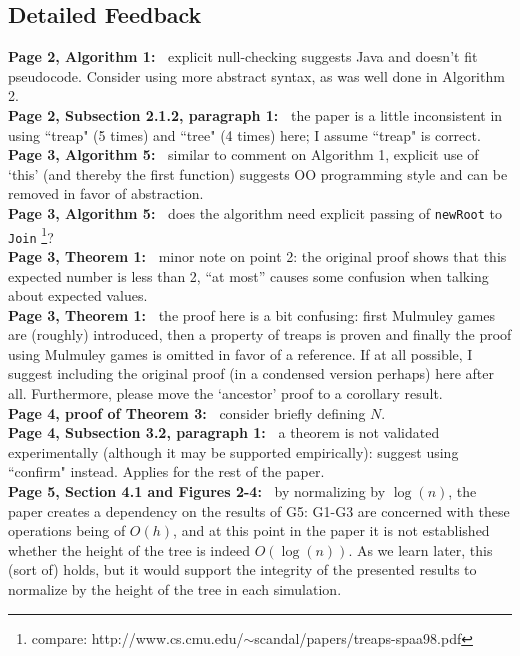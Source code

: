 \documentclass[11pt,a4paper,oneside,fleqn]{article}
\begin{document}
\subsection*{Detailed Feedback}
\textbf{Page 2, Algorithm 1:~} explicit null-checking suggests Java and doesn't fit pseudocode. Consider using more abstract syntax, as was well done in Algorithm 2. \\
\textbf{Page 2, Subsection 2.1.2, paragraph 1:~} the paper is a little inconsistent in using ``treap" (5 times) and ``tree" (4 times) here; I assume ``treap" is correct. \\
\textbf{Page 3, Algorithm 5:~} similar to comment on Algorithm 1, explicit use of `this' (and thereby the first function) suggests OO programming style and can be removed in favor of abstraction. \\
\textbf{Page 3, Algorithm 5:~} does the algorithm need explicit passing of \verb+newRoot+ to \verb+Join+ \footnote{compare: http://www.cs.cmu.edu/$\sim$scandal/papers/treaps-spaa98.pdf}? \\
\textbf{Page 3, Theorem 1:~} minor note on point 2: the original proof shows that this expected number is less than 2, ``at most'' causes some confusion when talking about expected values. \\
\textbf{Page 3, Theorem 1:~} the proof here is a bit confusing: first Mulmuley games are (roughly) introduced, then a property of treaps is proven and finally the proof using Mulmuley games is omitted in favor of a reference. If at all possible, I suggest including the original proof (in a condensed version perhaps) here after all. Furthermore, please move the `ancestor' proof to a corollary result. \\ 
\textbf{Page 4, proof of Theorem 3:~} consider briefly defining $N$. \\
\textbf{Page 4, Subsection 3.2, paragraph 1:~} a theorem is not validated experimentally (although it may be supported empirically): suggest using ``confirm" instead. Applies for the rest of the paper. \\
\textbf{Page 5, Section 4.1 and Figures 2-4:~} by normalizing by $\log(n)$, the paper creates a dependency on the results of G5: G1-G3 are concerned with these operations being of $O(h)$, and at this point in the paper it is not established whether the height of the tree is indeed $O(\log(n))$. As we learn later, this (sort of) holds, but it would support the integrity of the presented results to normalize by the height of the tree in each simulation. \\
\end{document}
